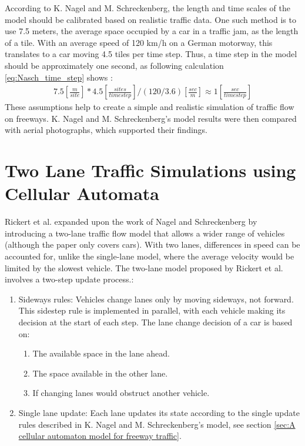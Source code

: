 According to K. Nagel and M. Schreckenberg, the length and time scales of the model should be calibrated based on realistic traffic data. One such method is to use 7.5 meters, the average space occupied by a car in a traffic jam, as the length of a tile. With an average speed of 120 km/h on a German motorway, this translates to a car moving 4.5 tiles per time step. Thus, a time step in the model should be approximately one second, as following calculation \ref{eq:Nasch_time_step} shows \cite{NASCH1992}:
    \begin{align}
        7.5[\frac{m}{site}] * 4.5 [\frac{sites}{timestep}] / (120/3.6)[\frac{sec}{m}]\approx 1[\frac{sec}{timestep}]
        \label{eq:Nasch_time_step}
    \end{align}
These assumptions help to create a simple and realistic simulation of traffic flow on freeways.  K. Nagel and M. Schreckenberg's model results were then compared with aerial photographs, which supported their findings.

\section{Two Lane Traffic Simulations using Cellular Automata}
\label{sec:Two Lane Traffic Simulations using Cellular Automata}
Rickert et al. expanded upon the work of Nagel and Schreckenberg by introducing a two-lane traffic flow model that allows a wider range of vehicles (although the paper only covers cars). With two lanes, differences in speed can be accounted for, unlike the single-lane model, where the average velocity would be limited by the slowest vehicle. The two-lane model proposed by Rickert et al. involves a two-step update process\cite{RICKERT1996534}.: 

\begin{enumerate}
    \item Sideways rules: Vehicles change lanes only by moving sideways, not forward. This sidestep rule is implemented in parallel, with each vehicle making its decision at the start of each step. The lane change decision of a car is based on:
    \begin{enumerate}
        \item The available space in the lane ahead.
        \item The space available in the other lane.
        \item If changing lanes would obstruct another vehicle.
    \end{enumerate}
    \item Single lane update:  Each lane updates its state according to the single update rules described in K. Nagel and M. Schreckenberg's model, see section \ref{sec:A cellular automaton model for freeway traffic}.
\end{enumerate}

